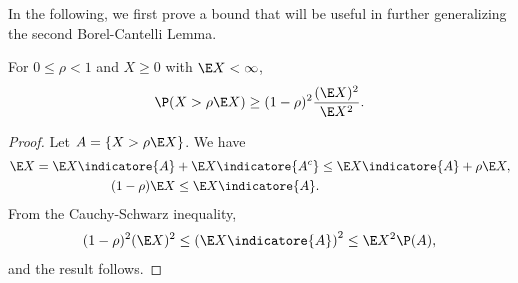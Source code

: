 \documentclass[../aipt.tex]{subfiles}
\begin{document}
In the following, we first prove a bound that will be useful in further generalizing the second Borel-Cantelli Lemma. 

\begin{Lemma}\label{wk6:lem:2ndmoment}
For $0\leq\rho<1$ and $X \geq 0$ with $\E X < \infty$,
\begin{align*}
\P(X > \rho \E X) \geq (1-\rho)^2\frac{(\E X)^2}{\E X^2}.
\end{align*}
\end{Lemma}
\begin{proof}
Let $A = \{ X > \rho \E X\}$. We have
\begin{align*}
\E X = \E X\indicatore{A} + \E X\indicatore{A^c} &\leq \E X\indicatore{A} + \rho \E X,\\
(1-\rho)\E X \leq \E X\indicatore{A}.
\end{align*}
From the Cauchy-Schwarz inequality,
\begin{align*}
(1-\rho)^2(\E X)^2 \leq \left(\E X\indicatore{A}\right)^2 \leq \E X^2 \P(A),
\end{align*}
and the result follows.
\end{proof}
\end{document}
